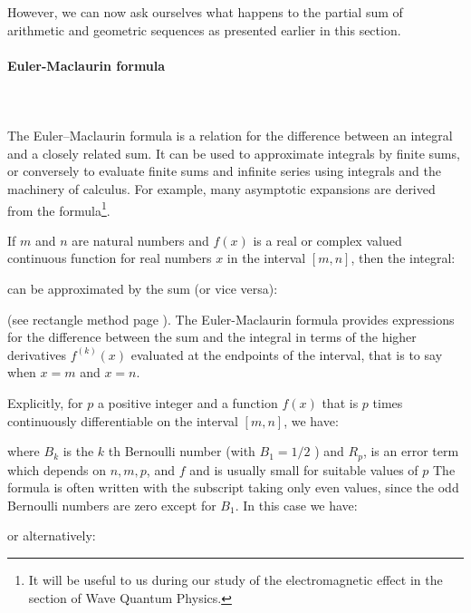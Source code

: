 	However, we can now ask ourselves what happens to the partial sum of arithmetic and geometric sequences as presented earlier in this section. 
	
	\paragraph{Euler-Maclaurin formula}\label{Euler-Maclaurin formula}\mbox{}\\\\
	The Euler–Maclaurin formula is a relation for the difference between an integral and a closely related sum. It can be used to approximate integrals by finite sums, or conversely to evaluate finite sums and infinite series using integrals and the machinery of calculus. For example, many asymptotic expansions are derived from the formula\footnote{It will be useful to us during our study of the electromagnetic effect in the section of Wave Quantum Physics.}.
	
	If $m$ and $n$ are natural numbers and $f(x)$ is a real or complex valued continuous function for real numbers $x$ in the interval $[m, n]$, then the integral:
	
	can be approximated by the sum (or vice versa):
	
	(see rectangle method page \pageref{rectangle integration method}). The Euler-Maclaurin formula provides expressions for the difference between the sum and the integral in terms of the higher derivatives $f^{(k)}(x)$ evaluated at the endpoints of the interval, that is to say when $x=m$ and $x=n$.
	
	Explicitly, for $p$ a positive integer and a function $f(x)$ that is $p$ times continuously differentiable on the interval $[m, n]$, we have:
	
	where $B_{k}$ is the $k$ th Bernoulli number (with $B_{1}=1 / 2$ ) and $R_{p}$, is an error term which depends on $n, m, p$, and $f$ and is usually small for suitable values of $p$ The formula is often written with the subscript taking only even values, since the odd Bernoulli numbers are zero except for $B_{1}$. In this case we have:
	
	or alternatively:
	
